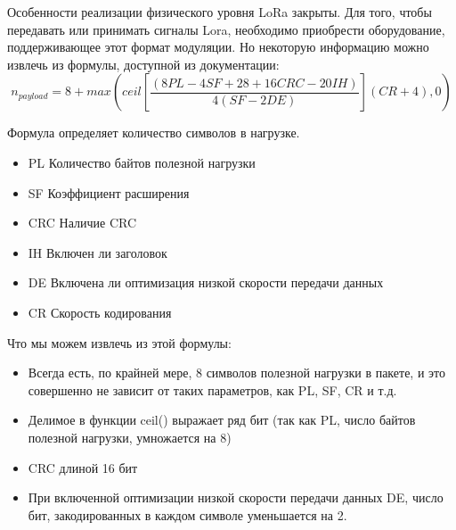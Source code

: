 Особенности реализации физического уровня LoRa закрыты. Для того, чтобы передавать или принимать сигналы Lora, необходимо приобрести оборудование, поддерживающее этот формат модуляции. Но некоторую информацию можно извлечь из формулы, доступной из документации:
\[
n_{payload} = 8 + max(ceil[\dfrac{(8PL-4SF+28+16CRC-20IH)}{4(SF-2DE)}](CR+4),0) \]

Формула определяет количество символов в нагрузке.
\begin{itemize}
\item{PL} Количество байтов полезной нагрузки
\item{SF} Коэффициент расширения
\item{CRC} Наличие CRC
\item{IH} Включен ли заголовок
\item{DE} Включена ли оптимизация низкой скорости передачи данных
\item{CR} Скорость кодирования
\end{itemize}
Что мы можем извлечь из этой формулы:
\begin{itemize}
\item Всегда есть, по крайней мере, 8 символов полезной нагрузки в пакете, и это совершенно не зависит от таких параметров, как PL, SF, CR и т.д.
\item Делимое в функции ceil() выражает ряд бит (так как PL, число байтов полезной нагрузки, умножается на 8)
\item CRC длиной 16 бит
\item При включенной оптимизации низкой скорости передачи данных DE, число бит, закодированных в каждом символе уменьшается на 2.
\end{itemize}